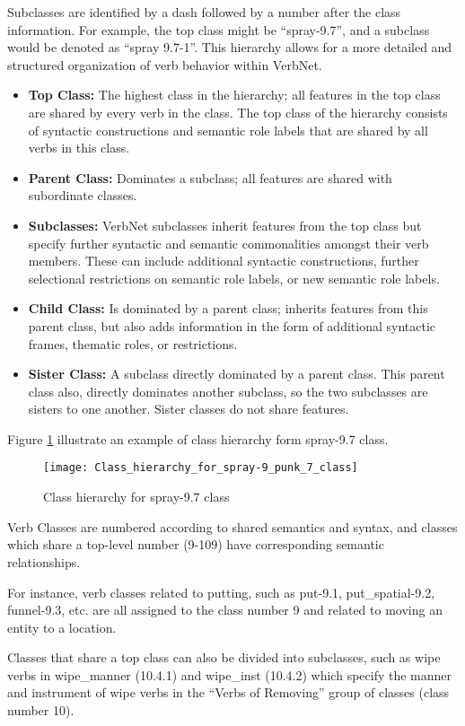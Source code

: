 Subclasses are identified by a dash followed by a number after the class information. For example, the top class might be \enquote{spray-9.7}, and a subclass would be denoted as \enquote{spray 9.7-1}. This hierarchy allows for a more detailed and structured organization of verb behavior within VerbNet. 
\begin{itemize}
\item \textbf{Top Class:} The highest class in the hierarchy; all features in the top class are shared by every verb in the class. The top class of the hierarchy consists of syntactic constructions and semantic role labels that are shared by all verbs in this class.
\item \textbf{Parent Class:} Dominates a subclass; all features are shared with subordinate classes.
\item \textbf{Subclasses:} VerbNet subclasses inherit features from the top class but specify further syntactic and semantic commonalities amongst their verb members. These can include additional syntactic constructions, further selectional restrictions on semantic role labels, or new semantic role labels.
\item \textbf{Child Class:} Is dominated by a parent class; inherits features from this parent class, but also adds information in the form of additional syntactic frames, thematic roles, or restrictions. 
\item \textbf{Sister Class:} A subclass directly dominated by a parent class. This parent class also, directly dominates another subclass, so the two subclasses are sisters to one another. Sister classes do not share features.
\end{itemize}
Figure \ref{fig:hierachy_class} illustrate an example of class hierarchy form spray-9.7 class.
\begin{figure}
\center
\texttt{[image: Class\_hierarchy\_for\_spray-9\_punk\_7\_class]}
\caption{Class hierarchy for spray-9.7 class \cite{heck2014quality}}\label{fig:hierachy_class}
\end{figure}
Verb Classes are numbered according to shared semantics and syntax, and classes which share a top-level number (9-109) have corresponding semantic relationships. 

For instance, verb classes related to putting, such as put-9.1, put\_spatial-9.2, funnel-9.3, etc. are all assigned to the class number 9 and related to moving an entity to a location. 

Classes that share a top class can also be divided into subclasses, such as wipe verbs in wipe\_manner (10.4.1) and wipe\_inst (10.4.2) which specify the manner and instrument of wipe verbs in the \enquote{Verbs of Removing} group of classes (class number 10). 

